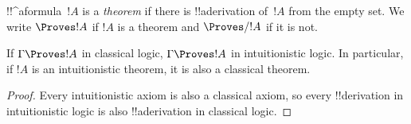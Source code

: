 \documentclass[../../../include/open-logic-section]{subfiles}
\begin{document}
\begin{defn}[Theorems]
!!^a{formula}~$!A$ is a \emph{theorem} if there is !!a{derivation}
of~$!A$ from the empty set.  We write $\Proves !A$ if $!A$ is a
theorem and $\Proves/ !A$ if it is not.
\end{defn}

\begin{prop}
  If $\Gamma \Proves !A$ in classical logic, $\Gamma \Proves !A$ in
  intuitionistic logic. In particular, if $!A$ is an intuitionistic
  theorem, it is also a classical theorem.
\end{prop}

\begin{proof}
  Every intuitionistic axiom is also a classical axiom, so every
  !!{derivation} in intuitionistic logic is also !!a{derivation} in
  classical logic.
\end{proof}
\end{document}
